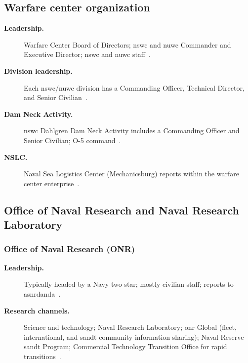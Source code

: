 \documentclass[../main.tex]{subfiles}
\begin{document}
\subsection{Warfare center organization}
\begin{description}
  \item[\textbf{Leadership.}] Warfare Center Board of Directors; \ac{nswc} and \ac{nuwc} Commander and Executive Director; \ac{nswc} and \ac{nuwc} staff~\autocite{edo-2-1-4-warfare-centers-2024}.
  \item[\textbf{Division leadership.}] Each \ac{nswc}/\ac{nuwc} division has a Commanding Officer, Technical Director, and Senior Civilian~\autocite{edo-2-1-4-warfare-centers-2024}.
  \item[\textbf{Dam Neck Activity.}] \ac{nswc} Dahlgren Dam Neck Activity includes a Commanding Officer and Senior Civilian; O-5 command~\autocite{edo-2-1-4-warfare-centers-2024}.
  \item[\textbf{NSLC.}] Naval Sea Logistics Center (Mechanicsburg) reports within the warfare center enterprise~\autocite{edo-2-1-4-warfare-centers-2024}.
\end{description}

\subsection{Office of Naval Research and Naval Research Laboratory}
\subsubsection{Office of Naval Research (ONR)}
\begin{description}
  \item[\textbf{Leadership.}] Typically headed by a Navy two-star; mostly civilian staff; reports to \ac{asnrdanda}~\autocite{edo-2-1-4-warfare-centers-2024}.
  \item[\textbf{Research channels.}] Science and technology; Naval Research Laboratory; \ac{onr} Global (fleet, international, and \ac{sandt} community information sharing); Naval Reserve \ac{sandt} Program; Commercial Technology Transition Office for rapid transitions~\autocite{edo-2-1-4-warfare-centers-2024}.
\end{description}
\end{document}
